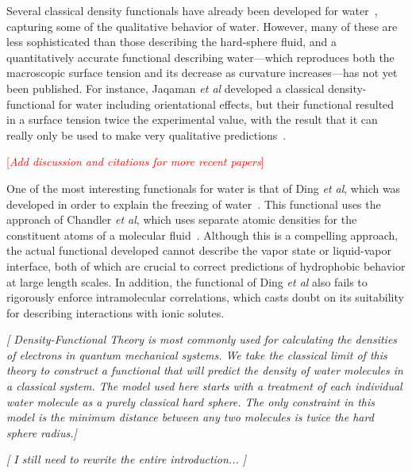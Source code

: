 \documentclass[letterpaper,twocolumn,amsmath,amssymb,prb]{revtex4-1}
\newcommand{\needsworklater}[1]{\emph{[#1]}}
\newcommand{\needsworknow}[1]{\textcolor{red}{[\emph{#1}]}}
\begin{document}
Several classical density functionals have already been developed for
water~\cite{ding1987, Yang1992, Jaqaman2004}, capturing some of the
qualitative behavior of water.  However, many of these are less
sophisticated than those describing the hard-sphere fluid, and a
quantitatively accurate functional describing water---which reproduces both
the macroscopic surface tension and its decrease as curvature
increases---has not yet been published.  For instance, Jaqaman \emph{et al}
developed a classical density-functional for water including orientational
effects, but their functional resulted in a surface tension twice the
experimental value, with the result that it can really only be used to make
very qualitative predictions~\cite{Jaqaman2004}.

\needsworknow{Add discussion and citations for more recent papers}

One of the most interesting functionals for water is that of Ding \emph{et
al}, which was developed in order to explain the freezing of
water~\cite{ding1987}.  This functional uses the approach of Chandler
\emph{et al}, which uses separate atomic densities for the constituent
atoms of a molecular fluid~\cite{chandler1986a, chandler1986b}.  Although
this is a compelling approach, the actual functional developed cannot
describe the vapor state or liquid-vapor interface, both of which are
crucial to correct predictions of hydrophobic behavior at large length
scales.  In addition, the functional of Ding \emph{et al} also fails to
rigorously enforce intramolecular correlations, which casts doubt on its
suitability for describing interactions with ionic solutes.

\needsworklater{
Density-Functional Theory is most commonly used for calculating the
densities of electrons in quantum mechanical systems.  We take the
classical limit of this theory to construct a functional that will predict
the density of water molecules in a classical system.  The model used here
starts with a treatment of each individual water molecule as a purely
classical hard sphere.  The only constraint in this model is
the minimum distance between any two molecules is twice the hard sphere
radius.}

\needsworklater{ I still need to rewrite the entire introduction... }

\end{document}
